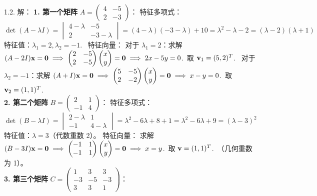 \begin{exer}
1.2. 解：
\textbf{1. 第一个矩阵} $A = \begin{pmatrix} 4 & -5 \\ 2 & -3 \end{pmatrix}$：
特征多项式：
$$ \det(A-\lambda I) = \begin{vmatrix} 4-\lambda & -5 \\ 2 & -3-\lambda \end{vmatrix} = (4-\lambda)(-3-\lambda) + 10 = \lambda^2 - \lambda - 2 = (\lambda-2)(\lambda+1) $$
特征值：$\lambda_1 = 2, \lambda_2 = -1$.~
特征向量：
对于 $\lambda_1 = 2$：求解 $(A-2I)\mathbf{x} = \mathbf{0} \implies \begin{pmatrix} 2 & -5 \\ 2 & -5 \end{pmatrix} \begin{pmatrix} x \\ y \end{pmatrix} = \mathbf{0} \implies 2x - 5y = 0$.~取 $\mathbf{v}_1 = (5, 2)^T$.~
对于 $\lambda_2 = -1$：求解 $(A+I)\mathbf{x} = \mathbf{0} \implies \begin{pmatrix} 5 & -5 \\ 2 & -2 \end{pmatrix} \begin{pmatrix} x \\ y \end{pmatrix} = \mathbf{0} \implies x - y = 0$.~取 $\mathbf{v}_2 = (1, 1)^T$.~
\\
\textbf{2. 第二个矩阵} $B = \begin{pmatrix} 2 & 1 \\ -1 & 4 \end{pmatrix}$：
特征多项式：
$$ \det(B-\lambda I) = \begin{vmatrix} 2-\lambda & 1 \\ -1 & 4-\lambda \end{vmatrix} = \lambda^2 - 6\lambda + 8 + 1 = \lambda^2 - 6\lambda + 9 = (\lambda-3)^2 $$
特征值：$\lambda = 3$（代数重数 2）。
特征向量：
求解 $(B-3I)\mathbf{x} = \mathbf{0} \implies \begin{pmatrix} -1 & 1 \\ -1 & 1 \end{pmatrix} \begin{pmatrix} x \\ y \end{pmatrix} = \mathbf{0} \implies x = y$.~取 $\mathbf{v} = (1, 1)^T$.~（几何重数为 1）。
\\
\textbf{3. 第三个矩阵} $C = \begin{pmatrix} 1 & 3 & 3 \\ -3 & -5 & -3 \\ 3 & 3 & 1 \end{pmatrix}$：

\end{exer}
